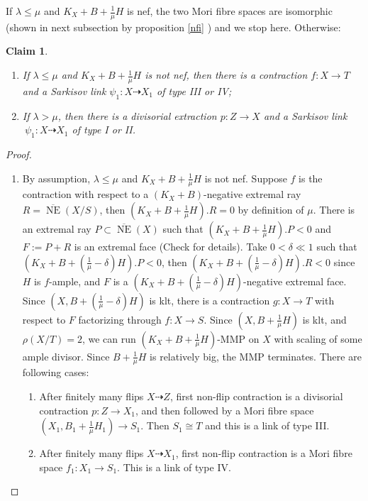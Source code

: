 \documentclass{article}
\newtheorem{claim}[defn]{Claim}
\begin{document}
If $ \lambda\leqslant\mu $ and $ K_X+B+\frac{1}{\mu}H $ is nef, the two Mori fibre spaces are isomorphic  (shown in next subsection by proposition \ref{nfi} ) and we stop here. Otherwise:
\begin{claim}
  \begin{enumerate}
  \item If $ \lambda\leqslant\mu $ and $ K_X+B+\frac{1}{\mu}H $ is not nef, then there is a contraction $f:X \to T$ and a Sarkisov link $\psi_{1}:X\dashrightarrow X_{1}$ of type III or IV;
    \item  If $ \lambda>\mu $, then there is a divisorial extraction $p:Z\to X$ and a Sarkisov link $\
     \psi_{1}:X\dashrightarrow X_{1}$ of type I or II.
\end{enumerate} 
\end{claim}
\begin{proof}
\begin{enumerate}
  \item\label{a} By assumption,  $\lambda\leqslant \mu$ and   $ K_X+B+\frac{1}{\mu}H $ is not nef. Suppose $ f $ is the contraction with respect to a $ (K_X+B) $-negative extremal ray $ R= \overline{\operatorname{ NE }}(X/S) $, then $ (K_X+B+\frac{1}{\mu}H).R=0 $ by definition of $ \mu $. There is an extremal ray $ P \subset \overline{\operatorname{ NE }}(X) $ such that $ (K_X+B+\frac{1}{\mu}H).P<0 $ and $ F:=P+R $ is an extremal face  (Check \cite[5.4.2]{cortiFactoringBirationalMaps} for details). Take  $ 0<\delta\ll 1 $ such that $ (K_X+B+(\frac{1}{\mu}-\delta)H).P<0 $, then $  (K_X+B+(\frac{1}{\mu}-\delta)H).R<0 $ since $H$ is $f$-ample, and $ F $ is a $  (K_X+B+(\frac{1}{\mu}-\delta)H) $-negative extremal face. Since $ (X,B+(\frac{1}{\mu}-\delta)H) $ is klt, there is  a contraction $ g:X\to T $ with respect  to $ F $ factorizing through $ f:X\to S $. Since  $ (X,B+\frac{1}{\mu}H) $ is klt, and $ \rho(X/T)=2 $,  we can  run $ (K_X+B+\frac{1}{\mu}H) $-MMP on $ X  $ with scaling of some ample divisor.  Since $ B+\frac{1}{\mu}H $ is relatively big,  the MMP terminates. There are following cases: 
  \begin{enumerate}
    \item\label{a1} 
After finitely many flips $ X\dashrightarrow Z $, first non-flip contraction is a divisorial contraction $ p:Z\to X_1 $, and then followed by a Mori fibre space $(X_{1},B_{1}+\frac{1}{\mu}H_{1} )\to S_{1}$. 
    Then  $S_{1} \cong T$ and this is a link of type III.     
   \item\label{a2}
      After finitely many flips $ X\dashrightarrow X_1 $, first non-flip contraction is a Mori fibre space $ f_1:X_1\to S_{1} $. This is a link of type IV.  

\end{enumerate}
\end{enumerate}
\end{proof}
\end{document}
